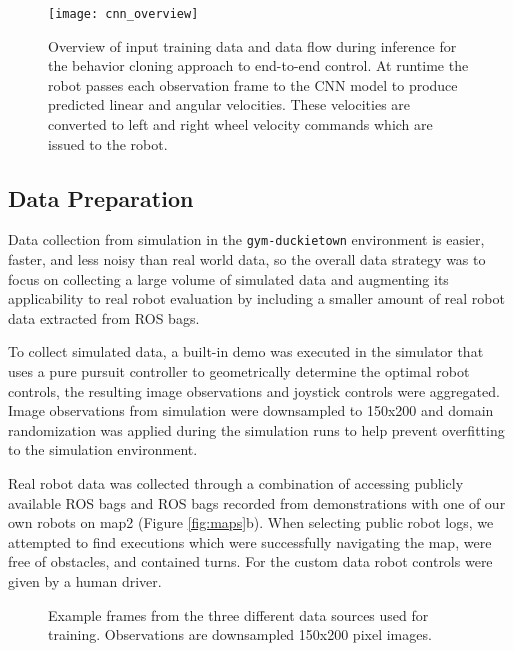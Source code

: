 \documentclass{article}
\begin{document}
\begin{figure}
\texttt{[image: cnn\_overview]}
\centering
\caption{Overview of input training data and data flow during inference for the behavior cloning approach to end-to-end control. At runtime the robot passes each observation frame to the CNN model to produce predicted linear and angular velocities. These velocities are converted to left and right wheel velocity commands which are issued to the robot.}
\label{fig:cnn_overview}
\end{figure}

\subsection{Data Preparation}

Data collection from simulation in the \texttt{gym-duckietown} environment is easier, faster, and less noisy than real world data, so the overall data strategy was to focus on collecting a large volume of simulated data and augmenting its applicability to real robot evaluation by including a smaller amount of real robot data extracted from ROS bags.

To collect simulated data, a built-in demo was executed in the simulator that uses a pure pursuit controller \cite{DBLP:journals/corr/PadenCYYF16} to geometrically determine the optimal robot controls, the resulting image observations and joystick controls were aggregated. Image observations from simulation were downsampled to 150x200 and domain randomization was applied during the simulation runs to help prevent overfitting to the simulation environment.

Real robot data was collected through a combination of accessing publicly available ROS bags \cite{paull17duckietown} and ROS bags recorded from demonstrations with one of our own robots on map2 (Figure \ref{fig:maps}b). When selecting public robot logs, we attempted to find executions which were successfully navigating the map, were free of obstacles, and contained turns. For the custom data robot controls were given by a human driver.

\begin{figure}
\centering
    \qquad
    \qquad
    \caption{Example frames from the three different data sources used for training. Observations are downsampled 150x200 pixel images.}
    \label{fig:data_examples}
\end{figure}
\end{document}
